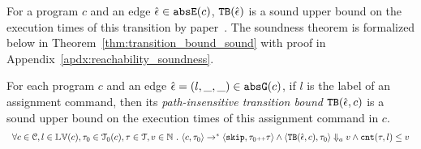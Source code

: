 \begin{enumerate}
For a program $c$ and an edge $\hat{\mathtt{\epsilon}{}} \in \mathtt{abs}{\mathtt{E}}(c)$,
${\mathtt{TB}}(\hat{\mathtt{\epsilon}{}})$ is a sound upper bound
on the execution times of this transition by paper~\cite{sinn2017complexity}.
The soundness theorem is formalized below in Theorem~\ref{thm:transition_bound_sound} with proof in Appendix~\ref{apdx:reachability_soundness}.
%
\begin{thm}
  \label{thm:transition_bound_sound}
For each program ${c}$ and an edge $\hat{\mathtt{\epsilon}{}} = (l, \_, \_) \in \mathtt{abs}{\mathtt{G}}(c)$, if $l$ is the label of an assignment command,
then its \emph{path-insensitive transition bound} ${\mathtt{TB}}(\hat{\mathtt{\epsilon}{}}, c)$ 
 is a sound upper bound on 
the execution times of this assignment command in $c$.
  \[
    \begin{array}{l}
      \forall c \in \mathcal{C}, l \in \mathbb{LV}(c),\mathtt{\tau}_0 \in \mathcal{T}_0(c), 
      \mathtt{\tau} \in \mathcal{T}, v \in \mathbb{N}
       ~.~ 
       \langle {c}, \mathtt{\tau}_0 \rangle \to^{*} \langle \mathtt{skip}, \mathtt{\tau}_0{\scriptscriptstyle ++}\mathtt{\tau} \rangle 
       \land \langle {\ensuremath{\mathtt{TB}}}(\hat{\mathtt{\epsilon}{}}, c), \mathtt{\tau}_0 \rangle \Downarrow_a v
       \land
      \mathtt{cnt}(\mathtt{\tau}, l) \leq v
    \end{array}
    \]
\end{thm}
%

\end{enumerate}
